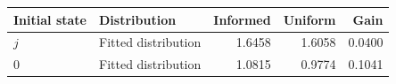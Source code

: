 \begin{tabular}{llrrr}\toprule
Initial state & Distribution & Informed & Uniform & Gain\\\midrule
$j$ & Fitted distribution & 1.6458 & 1.6058 & 0.0400 \\
$0$ & Fitted distribution & 1.0815 & 0.9774 & 0.1041 \\
\bottomrule\end{tabular}

